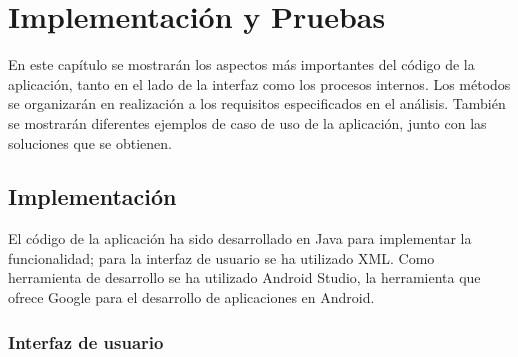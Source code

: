 \chapter{Implementación y Pruebas}
En este capítulo se mostrarán los aspectos más importantes del código de la aplicación, tanto en el lado de la interfaz como los procesos internos. Los métodos se organizarán en realización a los requisitos especificados en el análisis. También se mostrarán diferentes ejemplos de caso de uso de la aplicación, junto con las soluciones que se obtienen.
\section{Implementación}
El código de la aplicación ha sido desarrollado en Java para implementar la funcionalidad; para la interfaz de usuario se ha utilizado XML. Como herramienta de desarrollo se ha utilizado Android Studio, la herramienta que ofrece Google para el desarrollo de aplicaciones en Android.

\subsection[Interfaz de usuario]{Interfaz de usuario}
